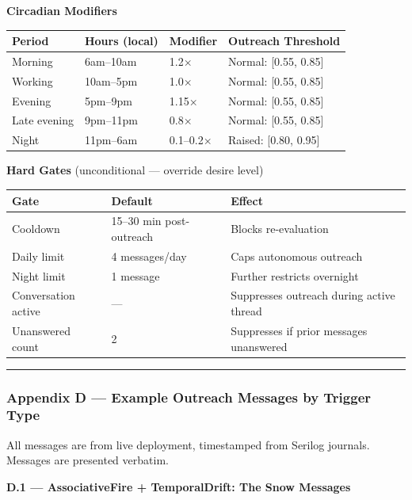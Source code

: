 \textbf{Circadian Modifiers}

\begin{longtable}[]{@{}llll@{}}
\toprule\noalign{}
Period & Hours (local) & Modifier & Outreach Threshold \\
\midrule\noalign{}
\endhead
\bottomrule\noalign{}
\endlastfoot
Morning & 6am--10am & 1.2× & Normal: {[}0.55, 0.85{]} \\
Working & 10am--5pm & 1.0× & Normal: {[}0.55, 0.85{]} \\
Evening & 5pm--9pm & 1.15× & Normal: {[}0.55, 0.85{]} \\
Late evening & 9pm--11pm & 0.8× & Normal: {[}0.55, 0.85{]} \\
Night & 11pm--6am & 0.1--0.2× & Raised: {[}0.80, 0.95{]} \\
\end{longtable}

\textbf{Hard Gates} (unconditional --- override desire level)

\begin{longtable}[]{@{}lll@{}}
\toprule\noalign{}
Gate & Default & Effect \\
\midrule\noalign{}
\endhead
\bottomrule\noalign{}
\endlastfoot
Cooldown & 15--30 min post-outreach & Blocks re-evaluation \\
Daily limit & 4 messages/day & Caps autonomous outreach \\
Night limit & 1 message & Further restricts overnight \\
Conversation active & --- & Suppresses outreach during active thread \\
Unanswered count & 2 & Suppresses if prior messages unanswered \\
\end{longtable}

\begin{center}\rule{0.5\linewidth}{0.5pt}\end{center}

\subsubsection{Appendix D --- Example Outreach Messages by Trigger
Type}\label{appendix-d-example-outreach-messages-by-trigger-type}

All messages are from live deployment, timestamped from Serilog
journals. Messages are presented verbatim.

\textbf{D.1 --- AssociativeFire + TemporalDrift: The Snow Messages}

